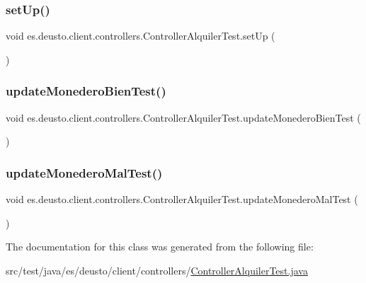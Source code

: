 \subsubsection{\texorpdfstring{setUp()}{setUp()}}
{\footnotesize\ttfamily void es.\+deusto.\+client.\+controllers.\+Controller\+Alquiler\+Test.\+set\+Up (\begin{DoxyParamCaption}{ }\end{DoxyParamCaption})}

\mbox{\label{classes_1_1deusto_1_1client_1_1controllers_1_1_controller_alquiler_test_a81394014c5b63f4935dbf83bf10ce780}} 
\subsubsection{\texorpdfstring{updateMonederoBienTest()}{updateMonederoBienTest()}}
{\footnotesize\ttfamily void es.\+deusto.\+client.\+controllers.\+Controller\+Alquiler\+Test.\+update\+Monedero\+Bien\+Test (\begin{DoxyParamCaption}{ }\end{DoxyParamCaption})}

\mbox{\label{classes_1_1deusto_1_1client_1_1controllers_1_1_controller_alquiler_test_abe8dc527a8abb24f73d9ac32cfb4ffbf}} 
\subsubsection{\texorpdfstring{updateMonederoMalTest()}{updateMonederoMalTest()}}
{\footnotesize\ttfamily void es.\+deusto.\+client.\+controllers.\+Controller\+Alquiler\+Test.\+update\+Monedero\+Mal\+Test (\begin{DoxyParamCaption}{ }\end{DoxyParamCaption})}



The documentation for this class was generated from the following file\+:\begin{DoxyCompactItemize}
\item 
src/test/java/es/deusto/client/controllers/\mbox{\hyperlink{_controller_alquiler_test_8java}{Controller\+Alquiler\+Test.\+java}}\end{DoxyCompactItemize}
